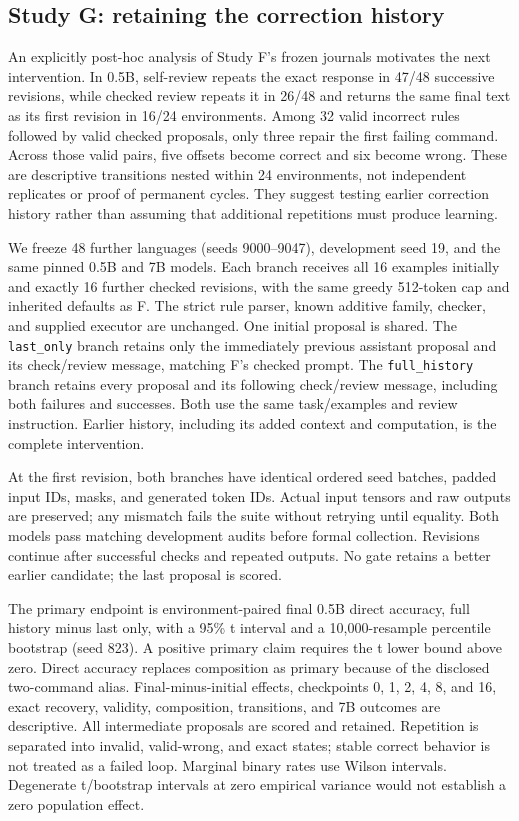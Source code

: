\documentclass[11pt]{article}
\begin{document}
\subsection{Study G: retaining the correction history}
An explicitly post-hoc analysis of Study F's frozen journals motivates the
next intervention. In 0.5B, self-review repeats the exact response in 47/48
successive revisions, while checked review repeats it in 26/48 and returns
the same final text as its first revision in 16/24 environments. Among 32
valid incorrect rules followed by valid checked proposals, only three repair
the first failing command. Across those valid pairs, five offsets become
correct and six become wrong. These are descriptive transitions nested within
24 environments, not independent replicates or proof of permanent cycles.
They suggest testing earlier correction history rather than assuming that
additional repetitions must produce learning.

We freeze 48 further languages (seeds 9000--9047), development seed 19,
and the same pinned 0.5B and 7B models. Each branch receives all 16 examples
initially and exactly 16 further checked revisions, with the same greedy
512-token cap and inherited defaults as F. The strict rule parser, known
additive family, checker, and supplied executor are unchanged. One initial
proposal is shared. The \texttt{last\_only} branch retains only the immediately
previous assistant proposal and its check/review message, matching F's checked
prompt. The \texttt{full\_history} branch retains every proposal and its
following check/review message, including both failures and successes. Both
use the same task/examples and review instruction. Earlier history, including
its added context and computation, is the complete intervention.

At the first revision, both branches have identical ordered seed batches,
padded input IDs, masks, and generated token IDs. Actual input tensors and
raw outputs are preserved; any mismatch fails the suite without retrying
until equality. Both models pass matching development audits before formal
collection. Revisions continue after successful checks and repeated outputs.
No gate retains a better earlier candidate; the last proposal is scored.

The primary endpoint is environment-paired final 0.5B direct accuracy,
full history minus last only, with a 95\% t interval and a 10,000-resample
percentile bootstrap (seed 823). A positive primary claim requires the t
lower bound above zero. Direct accuracy replaces composition as primary
because of the disclosed two-command alias. Final-minus-initial effects,
checkpoints 0, 1, 2, 4, 8, and 16, exact recovery, validity, composition,
transitions, and 7B outcomes are descriptive. All intermediate proposals
are scored and retained. Repetition is separated into invalid, valid-wrong,
and exact states; stable correct behavior is not treated as a failed loop.
Marginal binary rates use Wilson intervals. Degenerate t/bootstrap intervals
at zero empirical variance would not establish a zero population effect.
\end{document}
